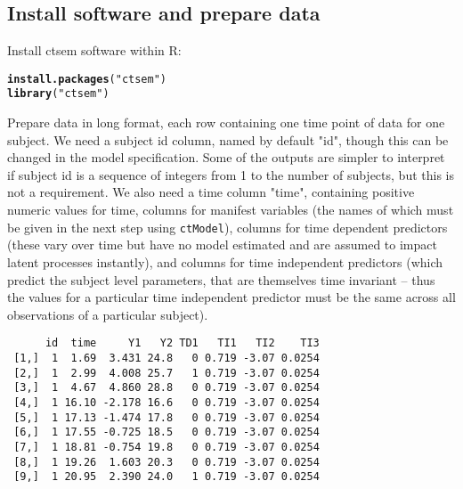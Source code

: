 \documentclass[11pt]{article}\usepackage[]{graphicx}\usepackage[]{color}
\makeatletter
\newcommand{\hlstr}[1]{\textcolor[rgb]{0.192,0.494,0.8}{#1}}%
\newcommand{\hlstd}[1]{\textcolor[rgb]{0.345,0.345,0.345}{#1}}%
\newcommand{\hlkwd}[1]{\textcolor[rgb]{0.737,0.353,0.396}{\textbf{#1}}}%
\newenvironment{kframe}{%
 \def\at@end@of@kframe{}%
 \ifinner\ifhmode%
  \def\at@end@of@kframe{\end{minipage}}%
  \begin{minipage}{\columnwidth}%
 \fi\fi%
 \def\FrameCommand##1{\hskip\@totalleftmargin \hskip-\fboxsep
 \colorbox{shadecolor}{##1}\hskip-\fboxsep
     \hskip-\linewidth \hskip-\@totalleftmargin \hskip\columnwidth}%
 \MakeFramed {\advance\hsize-\width
   \@totalleftmargin\z@ \linewidth\hsize
   \@setminipage}}%
 {\par\unskip\endMakeFramed%
 \at@end@of@kframe}
\newenvironment{knitrout}{}{} %
\makeatother
\begin{document}
\subsection{Install software and prepare data}
Install ctsem software within R:

\begin{knitrout}\small
{}\color{fgcolor}\begin{kframe}
\begin{alltt}
\hlkwd{install.packages}\hlstd{(}\hlstr{"ctsem"}\hlstd{)}
\hlkwd{library}\hlstd{(}\hlstr{"ctsem"}\hlstd{)}
\end{alltt}
\end{kframe}
\end{knitrout}

Prepare data in long format, each row containing one time point of data for one subject. We need a subject id column, named by default "id", though this can be changed in the model specification. Some of the outputs are simpler to interpret if subject id is a sequence of integers from 1 to the number of subjects, but this is not a requirement. We also need a time column "time", containing positive numeric values for time, columns for manifest variables (the names of which must be given in the next step using \verb|ctModel|), columns for time dependent predictors (these vary over time but have no model estimated and are assumed to impact latent processes instantly), and columns for time independent predictors (which predict the subject level parameters, that are themselves time invariant -- thus the values for a particular time independent predictor must be the same across all observations of a particular subject).

\begin{knitrout}\footnotesize
{}\color{fgcolor}\begin{kframe}
\begin{verbatim}
      id  time     Y1   Y2 TD1   TI1   TI2    TI3
 [1,]  1  1.69  3.431 24.8   0 0.719 -3.07 0.0254
 [2,]  1  2.99  4.008 25.7   1 0.719 -3.07 0.0254
 [3,]  1  4.67  4.860 28.8   0 0.719 -3.07 0.0254
 [4,]  1 16.10 -2.178 16.6   0 0.719 -3.07 0.0254
 [5,]  1 17.13 -1.474 17.8   0 0.719 -3.07 0.0254
 [6,]  1 17.55 -0.725 18.5   0 0.719 -3.07 0.0254
 [7,]  1 18.81 -0.754 19.8   0 0.719 -3.07 0.0254
 [8,]  1 19.26  1.603 20.3   0 0.719 -3.07 0.0254
 [9,]  1 20.95  2.390 24.0   1 0.719 -3.07 0.0254
\end{verbatim}
\end{kframe}
\end{knitrout}
\end{document}
